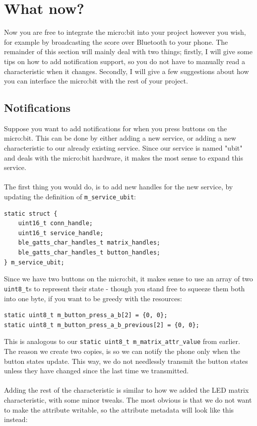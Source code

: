 \documentclass[11pt,a4paper]{article}
\begin{document}
\section{What now?}
Now you are free to integrate the micro:bit into your project however you wish, for example by broadcasting the score over Bluetooth to your phone. The remainder of this section will mainly deal with two things; firstly, I will give some tips on how to add notification support, so you do not have to manually read a characteristic when it changes. Secondly, I will give a few suggestions about how you can interface the micro:bit with the rest of your project.

\subsection{Notifications}
Suppose you want to add notifications for when you press buttons on the micro:bit. This can be done by either adding a new service, or adding a new characteristic to our already existing service. Since our service is named "ubit" and deals with the micro:bit hardware, it makes the most sense to expand this service.\\
\\
The first thing you would do, is to add new handles for the new service, by updating the definition of \texttt{m_service_ubit}:
\begin{verbatim}
static struct {
	uint16_t conn_handle;
	uint16_t service_handle;
	ble_gatts_char_handles_t matrix_handles;
	ble_gatts_char_handles_t button_handles;
} m_service_ubit;
\end{verbatim}
Since we have two buttons on the micro:bit, it makes sense to use an array of two \texttt{uint8_t}s to represent their state - though you stand free to squeeze them both into one byte, if you want to be greedy with the resources:
\begin{verbatim}
static uint8_t m_button_press_a_b[2] = {0, 0};
static uint8_t m_button_press_a_b_previous[2] = {0, 0};
\end{verbatim}
This is analogous to our \texttt{static uint8_t m_matrix_attr_value} from earlier. The reason we create two copies, is so we can notify the phone only when the button states update. This way, we do not needlessly transmit the button states unless they have changed since the last time we transmitted.\\
\\
Adding the rest of the characteristic is similar to how we added the LED matrix characteristic, with some minor tweaks. The most obvious is that we do not want to make the attribute writable, so the attribute metadata will look like this instead:
\end{document}

